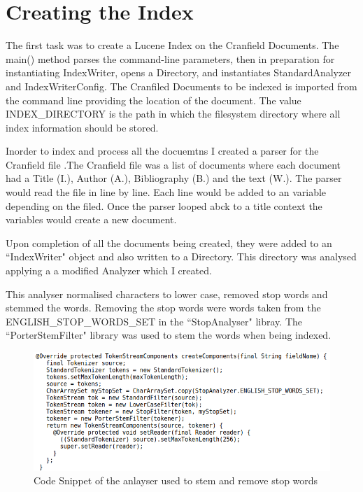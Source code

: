 \section{Creating the Index}

The first task was to create a Lucene Index on the Cranfield Documents. The main() method parses the command-line parameters, then in preparation for instantiating IndexWriter, opens a Directory, and instantiates StandardAnalyzer and IndexWriterConfig. The Cranfiled Documents to be indexed is imported from the command line providing the location of the document. The value INDEX\_DIRECTORY is the path in which the filesystem directory where all index information should be stored.  \par 

Inorder to index and process all the docuemtns I created a parser for the Cranfield file .The Cranfield file was a list of documents where each document had a Title (I.), Author (A.), Bibliography (B.) and the text (W.). The parser would read the file in line by line. Each line would be added to an variable depending on the filed. Once the parser looped abck to a title context the variables would create a new document. \par 
	
Upon completion of all the documents being created, they were added to an ``IndexWriter" object and also written to a Directory. This directory was analysed applying a  a modified Analyzer which I created. \par

This analyser normalised characters to lower case, removed stop words and stemmed the words. Removing the stop words were words taken from the ENGLISH\_STOP\_WORDS\_SET in the ``StopAnalyser" libray. The ``PorterStemFilter" library was used to stem the words when being indexed.   \newline

	\begin{figure}[ht!]
		\begin{center}
			\includegraphics[scale=.325 ]{2} 
			\caption{Code Snippet of the anlayser used to stem and remove stop words}
			\label{fig:1}
		\end{center}
	\end{figure} \par

